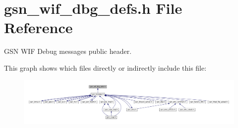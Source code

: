 \hypertarget{a00609}{
\section{gsn\_\-wif\_\-dbg\_\-defs.h File Reference}
\label{a00609}
}


GSN WIF Debug messages public header.  


This graph shows which files directly or indirectly include this file:
\nopagebreak
\begin{figure}[H]
\begin{center}
\leavevmode
\includegraphics[width=400pt]{a00856}
\end{center}
\end{figure}
